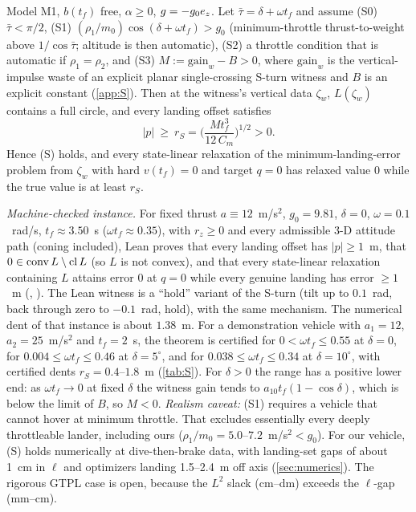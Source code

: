 \begin{theorem}\label{thm:S}
Model M1, $b(t_f)$ free, $\alpha\ge0$, $g=-g_0e_z$. Let $\bar\tau=\delta+\omega t_f$ and assume (S0) $\bar\tau<\pi/2$,
(S1) $(\rho_1/m_0)\cos(\delta+\omega t_f)>g_0$ (minimum-throttle thrust-to-weight above $1/\cos\bar\tau$; altitude is then
automatic), (S2) a throttle condition that is automatic if $\rho_1=\rho_2$, and (S3) $M:=\mathrm{gain}_w-B>0$, where
$\mathrm{gain}_w$ is the vertical-impulse waste of an explicit planar single-crossing S-turn witness and $B$ is an explicit
constant (\cref{app:S}). Then at the witness's vertical data $\zeta_w$, $L(\zeta_w)$ contains a full circle, and every
landing offset satisfies
\[
|p|\ \ge\ r_S=\Big(\frac{M t_f^3}{12\,C_m}\Big)^{1/2}>0 .
\]
Hence (S) holds, and every state-linear relaxation of the minimum-landing-error problem from $\zeta_w$ with hard
$v(t_f)=0$ and target $q=0$ has relaxed value $0$ while the true value is at least $r_S$.\Sproved\
\end{theorem}
\emph{Machine-checked instance.} For fixed thrust $a\equiv12$~m/s$^2$, $g_0=9.81$, $\delta=0$, $\omega=0.1$~rad/s,
$t_f\approx3.50$~s ($\omega t_f\approx0.35$), with $r_z\ge0$ and every admissible 3-D attitude path (coning included), Lean proves
that every landing offset has $|p|\ge1$~m, that $0\in\operatorname{conv} L\setminus\operatorname{cl} L$ (so $L$ is not convex), and that every state-linear
relaxation containing $L$ attains error $0$ at $q=0$ while every genuine landing has error $\ge1$~m
(\lean{Slice.lemmaS}, \lean{Slice.theoremD\_hard\_landing}). The Lean witness is a ``hold'' variant of the S-turn (tilt up to
$0.1$~rad, back through zero to $-0.1$~rad, hold), with the same mechanism. The numerical dent of that instance is about $1.38$~m.
For a demonstration vehicle with $a_1=12$, $a_2=25$~m/s$^2$ and $t_f=2$~s, the theorem is certified for
$0<\omega t_f\le0.55$ at $\delta=0$, for $0.004\le\omega t_f\le0.46$ at $\delta=5^\circ$, and for $0.038\le\omega t_f\le0.34$ at
$\delta=10^\circ$, with certified dents $r_S=0.4$--$1.8$~m (\cref{tab:S}). For $\delta>0$ the range has a positive lower end: as
$\omega t_f\to0$ at fixed $\delta$ the witness gain tends to $a_{10}t_f(1-\cos\delta)$, which is below the limit of $B$, so $M<0$. \emph{Realism caveat:}
(S1) requires a vehicle that cannot hover at minimum throttle. That excludes essentially every deeply throttleable lander,
including ours ($\rho_1/m_0=5.0$--$7.2$~m/s$^2<g_0$). For our vehicle, (S) holds numerically at dive-then-brake data, with
landing-set gaps of about 1~cm in $\ell$ and optimizers landing 1.5--2.4~m off axis (\cref{sec:numerics}). The rigorous GTPL
case is open, because the $L^2$ slack (cm--dm) exceeds the $\ell$-gap (mm--cm).

